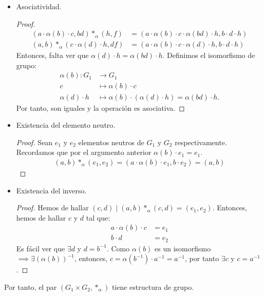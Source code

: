 \begin{itemize}
	\item Asociatividad.
		\begin{proof}
			\begin{align*}
				(a\cdot\alpha(b)\cdot c, bd) \ast_\alpha (h,f) &= (a\cdot\alpha(b)\cdot c\cdot \alpha(bd)\cdot h, b\cdot d\cdot h)\\
				(a,b)\ast_\alpha(c\cdot\alpha(d)\cdot h, df) &= (a\cdot\alpha(b)\cdot c\cdot \alpha(d)\cdot h, b\cdot d\cdot h)
			\end{align*}
			Entonces, falta ver que $\alpha(d)\cdot h = \alpha(bd)\cdot h$. Definimos el isomorfismo de grupo:
			\begin{align*}
				\alpha(b) : G_1 &\longrightarrow G_1\\
				c &\longmapsto \alpha(b)\cdot c\\
				\alpha(d)\cdot h &\longmapsto \alpha(b)\cdot(\alpha(d)\cdot h) = \alpha(bd) \cdot h.
			\end{align*}
			Por tanto, son iguales y la operación es asociativa.
		\end{proof}	
	\item Existencia del elemento neutro.
		\begin{proof}
			Sean $e_1$ y $e_2$ elementos neutros de $G_1$ y $G_2$ respectivamente. Recordamos que por el argumento anterior $\alpha(b)\cdot e_1 = e_1$.
			\begin{align*}
				(a,b) \ast_\alpha (e_1, e_2) = (a \cdot \alpha(b) \cdot e_1, b \cdot e_2) = (a,b)
			\end{align*}
		\end{proof}
	\item Existencia del inverso.
		\begin{proof}
			Hemos de hallar $(c,d) \mid (a,b)\ast_\alpha(c,d) = (e_1,e_2)$.  Entonces, hemos de hallar $c$ y $d$ tal que:
			\begin{align*}
				a \cdot \alpha(b) \cdot c &= e_1\\
				b \cdot d &= e_2
			\end{align*}
			Es fácil ver que $\exists d$ y $d = b^{-1}$. Como $\alpha(b)$ es un isomorfismo $\implies \exists (\alpha(b))^{-1}$, entonces, $c = \alpha(b^{-1}) \cdot a^{-1} = a^{-1}$, por tanto $\exists c$ y $c = a^{-1}$.
		\end{proof}
		
\end{itemize}
Por tanto, el par $(G_1 \times G_2, \ast_\alpha)$ tiene estructura de grupo.\\

